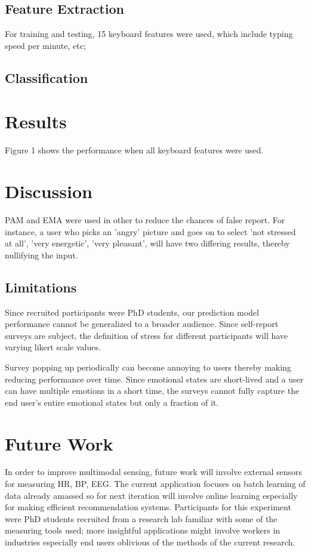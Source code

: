 \documentclass{article}
\begin{document}
\subsection{Feature Extraction}
For training and testing, 15 keyboard features were used, which include typing speed per minute, etc;
\subsection{Classification}


\section{Results}
Figure 1 shows the performance when all keyboard features were used. 




\section{Discussion}
PAM and EMA were used in other to reduce the chances of false report. For instance, a user who picks an 'angry' picture and goes on to select 'not stressed at all', 'very energetic', 'very pleasant', will have two differing results, thereby nullifying the input. 
\subsection{Limitations}
Since recruited participants were PhD students, our prediction model performance cannot be generalized to a broader audience. Since self-report surveys are subject, the definition of stress for different participants will have varying likert scale values. 

Survey popping up periodically can become annoying to users thereby making reducing performance over time. Since emotional states are short-lived and a user can have multiple emotions in a short time, the surveys cannot fully capture the end user's entire emotional states but only a fraction of it.


\section{Future Work}
In order to improve multimodal sensing, future work will involve external sensors for measuring HR, BP, EEG. The current application focuses on batch learning of data already amassed so for next iteration will involve online learning especially for making efficient recommendation systems. Participants for this experiment were PhD students recruited from a research lab familiar with some of the measuring tools used; more insightful applications might involve workers in industries especially end users oblivious of the methods of the current research.
\end{document}
